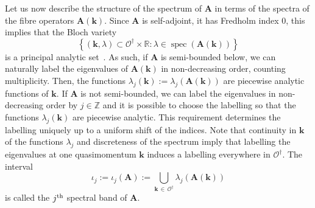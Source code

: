 \documentclass[AHL,Unicode,longabstracts,published]{cedram}
\DeclareMathOperator{\spec}{spec}
\newcommand{\R}{\mathbb R}
\newcommand{\Z}{\mathbb Z}
\newcommand{\CO}{\mathcal{O}}
\newcommand{\BA}{\mathbf A}
\newcommand{\bk}{\mathbf k}
\newcommand{\set}[1]{\left\{ #1 \right\}}
\begin{document}
Let us now describe the structure of the spectrum of $\BA$ in terms of the spectra of the fibre operators $\BA(\bk)$. Since $\BA$ is self-adjoint, it has Fredholm index $0$, this implies that the Bloch variety
\begin{equation}
\set{(\bk,\lambda) \subset \CO^\dagger \times \R : \lambda \in \spec(\BA(\bk))}
\end{equation}
is a principal analytic set~\cite[Corollary~3.1.6 and Section~3.4.C]{Kuchment}. As such, if $\BA$ is semi-bounded below, we can naturally label the eigenvalues of $\BA(\bk)$ in non-decreasing order, counting multiplicity. Then, the functions $\lambda_j(\bk):= \lambda_j(\BA(\bk))$ are piecewise analytic functions of $\bk$. If $\BA$ is not semi-bounded, we can label the eigenvalues in non-decreasing order by $j \in \Z$ and it is possible to choose the labelling so that the functions $\lambda_j(\bk)$ are piecewise analytic. This requirement determines the labelling uniquely up to a uniform shift of the indices. Note that continuity in $\bk$ of the functions $\lambda_j$ and discreteness of the spectrum imply that labelling the eigenvalues at one quasimomentum $\bk$ induces a labelling everywhere in $\CO^\dagger$. The interval
\begin{equation}
\iota_j:= \iota_j(\BA) := \bigcup_{\bk\,\in \,\CO^\dagger} \lambda_j(\BA(\bk))
\end{equation}
is called the $j^{\rm th}$ spectral band of $\BA$.
\end{document}

